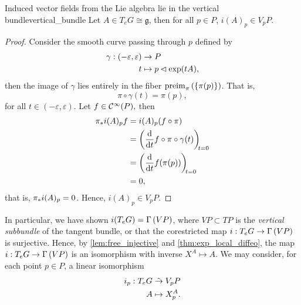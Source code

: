 \begin{lemma}{Induced vector fields from the Lie algebra lie in the vertical bundle}{vertical_bundle}
    Let \(A \in T_eG \cong \mathfrak{g}\), then for all \(p \in P\), \(i(A)_p \in V_pP.\)
\end{lemma}
\begin{proof}
    Consider the smooth curve passing through \(p\) defined by
    \begin{align*}
        \gamma : (-\varepsilon,\varepsilon) &\to P\\
                                          t &\mapsto p \mathbin{\vartriangleleft} \exp(tA),
    \end{align*}
    then the image of \(\gamma\) lies entirely in the fiber \(\operatorname{preim}_{\pi}{\left(\{\pi(p)\}\right)}\). That is,
    \begin{equation*}
        \pi \circ \gamma (t) = \pi(p),
    \end{equation*}
    for all \(t \in (-\varepsilon,\varepsilon).\) Let \(f \in \mathcal{C}^\infty(P),\) then
    \begin{align*}
        \pf{\pi}{i(A)_p}f &= i(A)_p (f \circ \pi)\\
                          &= \diff*{f \circ \pi \circ \gamma(t)}{t}[t=0]\\
                          &= \diff*{f(\pi(p))}{t}[t=0]\\
                          &= 0,
    \end{align*}
    that is, \({\pi}_{\ast{}}{i(A)_p} = 0\). Hence, \(i(A)_p \in V_pP.\)
\end{proof}

In particular, we have shown \(i(T_eG) = \Gamma\left(VP\right)\), where \(VP \subset TP\) is the \emph{vertical subbundle} of the tangent bundle, or that the corestricted map \(i : T_eG \to \Gamma\left(VP\right)\) is surjective. Hence, by \cref{lem:free_injective} and \cref{thm:exp_local_diffeo}, the map \(i : T_eG \to \Gamma\left(VP\right)\) is an isomorphism with inverse \(X^A \mapsto A\). We may consider, for each point \(p \in P\), a linear isomorphism
\begin{align*}
    i_p : T_eG &\mathrel{\tilde{\to}} V_pP\\
             A &\mapsto X_p^A.
\end{align*}

